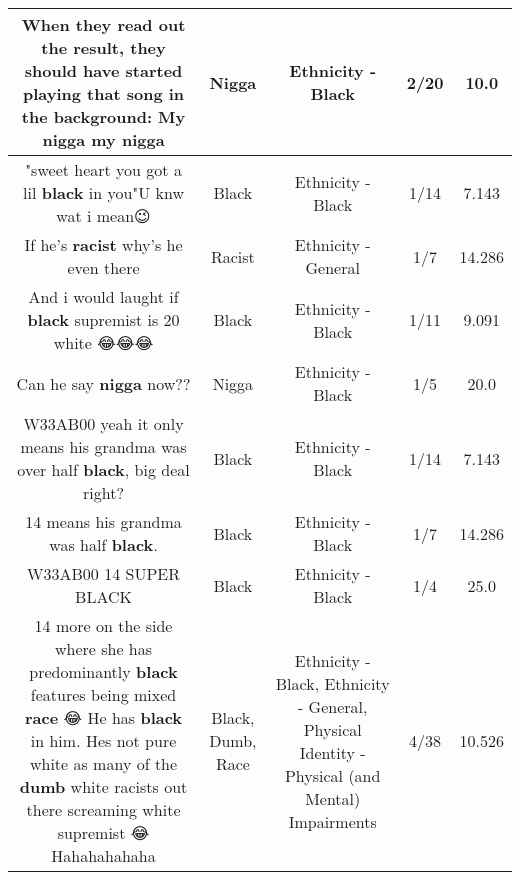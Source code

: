\documentclass[11pt]{article}
\newlength\mylength
\begin{document}
\begin{center}
\begin{longtable}{|C{.65\mylength}|C{.30\mylength}|C{.12\mylength}|C{.12\mylength}|C{.12\mylength}|}
  \small When they read out the result, they should have started playing that song in the background: My \textbf{nigga} my nigga\normalsize   & Nigga & Ethnicity - Black & 2/20 & 10.0 \\  \hline
  \small "sweet heart you got a lil \textbf{black} in you"U knw wat i mean😉\normalsize   & Black & Ethnicity - Black & 1/14 & 7.143 \\  \hline
  \small If he's \textbf{racist} why's he even there\normalsize   & Racist & Ethnicity - General & 1/7 & 14.286 \\  \hline
  \small And i would laught if \textbf{black} supremist is 20 white 😂😂😂\normalsize   & Black & Ethnicity - Black & 1/11 & 9.091 \\  \hline
  \small Can he say \textbf{nigga} now??\normalsize   & Nigga & Ethnicity - Black & 1/5 & 20.0 \\  \hline
  \small W33AB00 yeah it only means his grandma was over half \textbf{black}, big deal right?\normalsize   & Black & Ethnicity - Black & 1/14 & 7.143 \\  \hline
  \small 14 means his grandma was half \textbf{black}.\normalsize   & Black & Ethnicity - Black & 1/7 & 14.286 \\  \hline
  \small W33AB00 14 SUPER BLACK\normalsize   & Black & Ethnicity - Black & 1/4 & 25.0 \\  \hline
  \small 14 more on the side where she has predominantly \textbf{black} features being mixed \textbf{race} 😂 He has \textbf{black} in him. Hes not pure white as many of the \textbf{dumb} white racists out there screaming white supremist 😂 Hahahahahaha\normalsize   & Black, Dumb, Race & Ethnicity - Black, Ethnicity - General, Physical Identity - Physical (and Mental) Impairments & 4/38 & 10.526 \\  \hline

\end{longtable}
\end{center}
\end{document}
